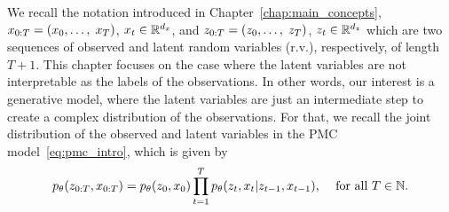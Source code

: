 We recall the notation introduced in Chapter~\ref{chap:main_concepts},
$x_{0:T}=(x_{0}, \dots,\; x_{T})$, $x_t \in \mathbb{R}^{d_{x}}$, and
$z_{0:T}=(z_{0}, \dots,\; z_{T})$,  $z_t \in \mathbb{R}^{d_{z}}$
which are two sequences of observed and latent  random variables (r.v.), respectively, 
of length $T+1$.
This chapter focuses on the case where the latent variables 
are not interpretable as the labels of the observations. In other words,
our interest is a generative model, where the latent variables are 
just an intermediate step to create a complex distribution of the observations.
For that, we recall the joint distribution of the observed and latent variables
in the PMC model~\eqref{eq:pmc_intro},  which is given by
\begin{equation*}
    p_{\theta}(z_{0:T}, x_{0:T}) = p_{\theta}(z_0,x_0)\prod_{t=1}^T 
    p_{\theta}(z_t,x_t|z_{t-1},x_{t-1}) \text{, } 
    \quad  \text{for all } T \in \mathbb{N}  \text{.}
\end{equation*}

